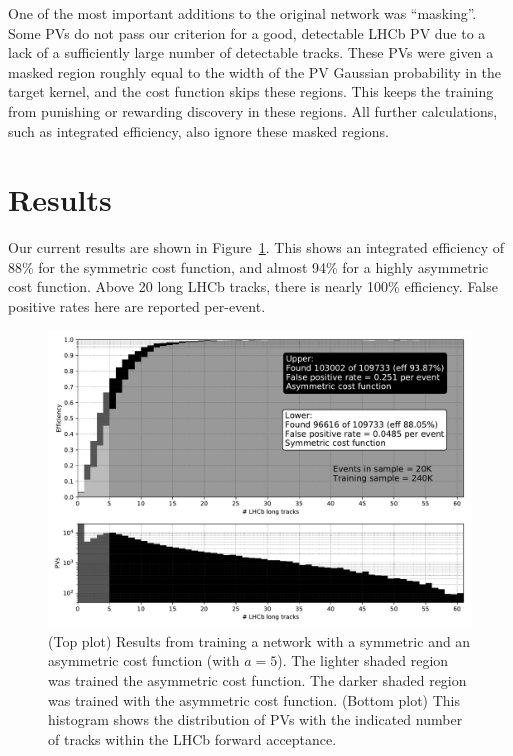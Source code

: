 \documentclass[a4paper]{jpconf}
\begin{document}
One of the most important additions to the original network was ``masking''. Some PVs do not pass our criterion for a good, detectable LHCb PV due to a lack of a sufficiently large number of detectable tracks. These PVs were given a masked region roughly equal to the width of the PV Gaussian probability in the target kernel, and the cost function skips these regions. This keeps the training from punishing or rewarding discovery in these regions. All further calculations, such as integrated efficiency, also ignore these masked regions.

\section{Results}

Our current results are shown in Figure~\ref{fig:results}. This shows an integrated efficiency of 88\% for the symmetric cost function, and almost 94\% for a highly asymmetric cost function. Above 20 long LHCb tracks, there is nearly 100\% efficiency. False positive rates here are reported per-event.

\begin{figure}
	\centering
	\includegraphics[width=\textwidth]{images/effntrackspaper.pdf}
	\caption{
		(Top plot) Results from training a network with a symmetric and an asymmetric cost function (with $a=5$).
		The lighter shaded region was trained the asymmetric cost function. The darker shaded region was trained with the asymmetric cost function.
		(Bottom plot) This histogram shows the distribution of PVs with the indicated number of tracks within the LHCb forward acceptance.
	}
    \label{fig:results}
\end{figure}
\end{document}
